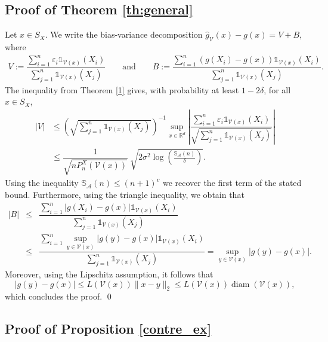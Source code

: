 \documentclass[paper=a4, fontsize=11pt]{scrartcl}
\newcommand{\diam}{\operatorname{diam}}
\begin{document}
\subsection*{Proof of Theorem \ref{th:general}}

    Let \(x \in S_X\). We write the bias-variance decomposition 
$\hat g_{\mathcal V}(x) - g(x) = V + B$, where \begin{align*}
    V := \dfrac{\sum_{i=1}^n \varepsilon_i \mathds 1 _{ \mathcal V(x) }(X_i)}{\sum_{j=1}^n \mathds 1 _{ \mathcal V(x) }(X_j)} \qquad \text{and}\qquad
       B := \dfrac{\sum_{i=1}^n \left(g(X_i) - g(x)\right) \mathds 1 _{ \mathcal V(x) }(X_i)}{\sum_{j=1}^n \mathds 1 _{ \mathcal V(x) }(X_j)}.
\end{align*}
The inequality from Theorem \ref{1} gives, with probability at least $1 - 2\delta$, for all $x \in S_X $,
\begin{align*}
    |V| &\leq \left({\sqrt{\sum_{j=1}^n \mathds 1 _{ \mathcal V(x) }(X_j)}} \right)^{-1} \sup_{x\in \mathbb R^d} \left| \dfrac{\sum_{i=1}^n \varepsilon_i \mathds 1 _{ \mathcal V(x) }(X_i)}{\sqrt{\sum_{j=1}^n \mathds 1 _{ \mathcal V(x) }(X_j)}} \right| \\ &\leq \dfrac{1}{\sqrt{n P_n^X(\mathcal{V}(x))}} \ \sqrt{2 \sigma^2 \log\left( \frac{\mathbb S_\mathcal A(n)}{\delta} \right)} .
\end{align*}
Using the inequality $\mathbb S_\mathcal A(n) \leq (n+1)^v$ we recover the first term of the stated bound. Furthermore, using the triangle inequality, we obtain that
\begin{eqnarray*}
    |B| &\leq& \dfrac{\sum_{i=1}^n \left|g(X_i) - g(x)\right| \mathds 1 _{ \mathcal V(x) }(X_i)}{\sum_{j=1}^n \mathds 1 _{ \mathcal V(x) }(X_j)} \\ &\leq& \dfrac{\sum_{i=1}^n \sup_{y \in \mathcal V(x)} |g(y) - g(x)| \mathds 1 _{ \mathcal V(x) }(X_i)}{\sum_{j=1}^n \mathds 1 _{ \mathcal V(x) }(X_j)} = \sup_{y \in \mathcal V(x)} |g(y) - g(x)|.
\end{eqnarray*}
Moreover, using the Lipschitz assumption, it follows that
$$|g(y) - g(x)| \leq  L(\mathcal V(x)) \|x-y\|_2  \leq L(\mathcal V(x)) \diam  (\mathcal V(x) ) , $$
which concludes the proof. \qed

\subsection*{Proof of Proposition \ref{contre_ex}}
\end{document}
